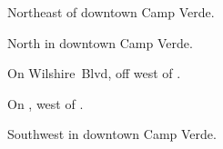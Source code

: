 
\begin{LocationList}

Northeast of downtown Camp Verde.

North in downtown Camp Verde.

On Wilshire~Blvd, off  west of  .

\Location{\TruckStop \Gas \Rest}
On , west of  .

Southwest in downtown Camp Verde.

\end{LocationList}
